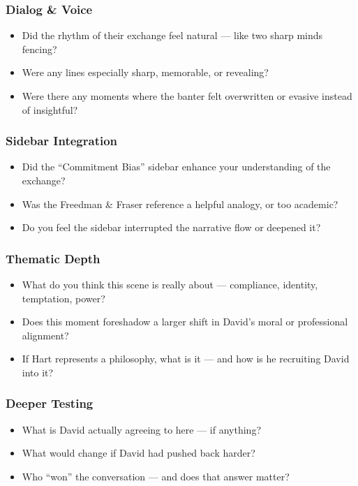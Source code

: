 \subsubsection*{Dialog \& Voice}

\begin{itemize}
  \item Did the rhythm of their exchange feel natural — like two sharp minds fencing?
  \item Were any lines especially sharp, memorable, or revealing?
  \item Were there any moments where the banter felt overwritten or evasive instead of insightful?
\end{itemize}

\subsubsection*{Sidebar Integration}

\begin{itemize}
  \item Did the ``Commitment Bias'' sidebar enhance your understanding of the exchange?
  \item Was the Freedman \& Fraser reference a helpful analogy, or too academic?
  \item Do you feel the sidebar interrupted the narrative flow or deepened it?
\end{itemize}

\subsubsection*{Thematic Depth}

\begin{itemize}
  \item What do you think this scene is really about — compliance, identity, temptation, power?
  \item Does this moment foreshadow a larger shift in David’s moral or professional alignment?
  \item If Hart represents a philosophy, what is it — and how is he recruiting David into it?
\end{itemize}

\subsubsection*{Deeper Testing}

\begin{itemize}
  \item What is David actually agreeing to here — if anything?
  \item What would change if David had pushed back harder?
  \item Who “won” the conversation — and does that answer matter?
\end{itemize}





